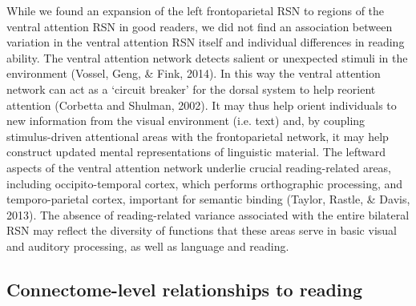 While we found an expansion of the left frontoparietal RSN to regions of the ventral attention RSN in good readers, we did not find an association between variation in the ventral attention RSN itself and individual differences in reading ability. The ventral attention network detects salient or unexpected stimuli in the environment (Vossel, Geng, & Fink, 2014). In this way the ventral attention network can act as a ‘circuit breaker’ for the dorsal system to help reorient attention (Corbetta and Shulman, 2002). It may thus help orient individuals to new information from the visual environment (i.e. text) and, by coupling stimulus-driven attentional areas with the frontoparietal network, it may help construct updated mental representations of linguistic material. The leftward aspects of the ventral attention network underlie crucial reading-related areas, including occipito-temporal cortex, which performs orthographic processing, and temporo-parietal cortex, important for semantic binding (Taylor, Rastle, & Davis, 2013). The absence of reading-related variance associated with the entire bilateral RSN may reflect the diversity of functions that these areas serve in basic visual and auditory processing, as well as language and reading. 

\subsection{Connectome-level relationships to reading}

